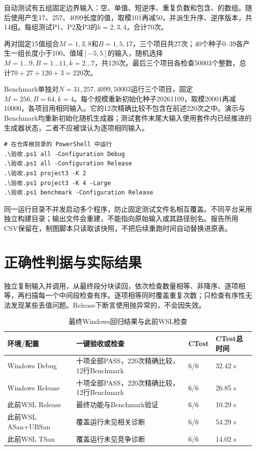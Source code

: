 自动测试有五组固定边界输入：空、单值、短逆序、重复负数和包含、的数组。随后使用产生17、257、4099长度的值，取模101再减50，并派生升序、逆序版本，共14组。每组测试P1、P2及P3的$k=2,3,4$，合计70次。

再对固定15值组合$M=1,3,8$和$B=1,5,17$，三个项目共27次；40个种子0--39各产生一组长度小于100、值域$[-5,5]$的输入，随机选择$M=1\ldots9,B=1\ldots11,k=2\ldots7$，共120次。最后三个项目各检查50003个整数，总计$70+27+120+3=220$次。

Benchmark单独对$N=31,257,4099,50003$运行三个项目，固定$M=256,B=64,k=4$。每个规模重新初始化种子20261109，取模20001再减10000，各项目用相同输入。它的12次精确比较不包含在前述220次之中。演示与Benchmark均重新初始化随机生成器；测试套件末尾大输入使用套件内已经推进的生成器状态，二者不应被误认为逐项相同输入。

\begin{Verbatim}[fontsize=\small,numbers=none]
# 在仓库根目录的 PowerShell 中运行
.\验收.ps1 all -Configuration Debug
.\验收.ps1 all -Configuration Release
.\验收.ps1 project3 -K 2
.\验收.ps1 project3 -K 4 -Large
.\验收.ps1 benchmark -Configuration Release
\end{Verbatim}

同一运行目录不并发启动多个程序，防止固定测试文件名相互覆盖。不同平台采用独立构建目录；输出文件会重建，不能指向原始输入或其路径别名。报告所用CSV保留在，制图脚本只读取该快照，不把后续重跑时间自动替换进原表。

\section{正确性判据与实际结果}
独立复制输入并调用，从最终段分块读回，依次检查数量相等、非降序、逐项相等，再扫描每一个中间段检查有序。逐项相等同时覆盖重复次数；只检查有序性无法发现某些丢值问题。Release下断言使用抛异常的，不会因失效。

\begin{table}[H]\centering\caption{最终Windows回归结果与此前WSL检查}\label{tab:regression}
\small\begin{tabularx}{\linewidth}{lYYY}\toprule
环境/配置 & 一键验收或检查 & CTest & CTest总时间\\\midrule
Windows Debug & 十项全部PASS，220次精确比较，12行Benchmark & 6/6 & 32.42 s\\
Windows Release & 十项全部PASS，220次精确比较，12行Benchmark & 6/6 & 26.85 s\\
此前WSL Release & 最终功能与Benchmark验证 & 6/6 & 10.29 s\\
此前WSL ASan+UBSan & 覆盖运行未见相关诊断 & 6/6 & 54.29 s\\
此前WSL TSan & 覆盖运行未见竞争诊断 & 6/6 & 14.02 s\\\bottomrule
\end{tabularx}\end{table}

